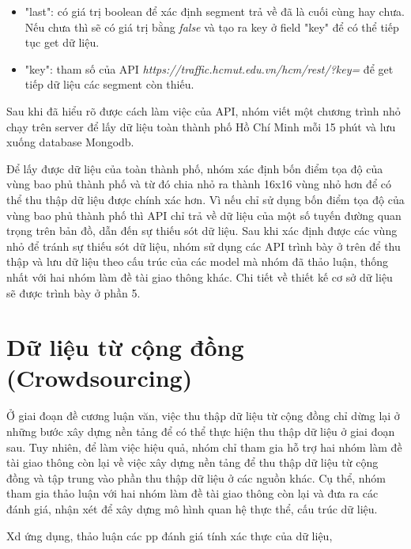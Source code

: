 \begin{itemize}
\begin{itemize}
    \item "last": có giá trị boolean để xác định segment trả về đã là cuối cùng hay chưa. Nếu chưa thì sẽ có giá trị bằng \textit{false} và tạo ra key ở field "key" để có thể tiếp tục get dữ liệu.
    \item "key": tham số của API \textit{https://traffic.hcmut.edu.vn/hcm/rest/?key=} để get tiếp dữ liệu các segment còn thiếu.
    \end{itemize}
\end{itemize}
Sau khi đã hiểu rõ được cách làm việc của API, nhóm viết một chương trình nhỏ chạy trên server để lấy dữ liệu toàn thành phố Hồ Chí Minh mỗi 15 phút và lưu xuống database Mongodb.

Để lấy được dữ liệu của toàn thành phố, nhóm xác định bốn điểm tọa độ của vùng bao phủ thành phố và từ đó chia nhỏ ra thành 16x16 vùng nhỏ hơn để có thể thu thập dữ liệu được chính xác hơn. Vì nếu chỉ sử dụng bốn điểm tọa độ của vùng bao phủ thành phố thì API chỉ trả về dữ liệu của một số tuyến đường quan trọng trên bản đồ, dẫn đến sự thiếu sót dữ liệu. Sau khi xác định được các vùng nhỏ để tránh sự thiếu sót dữ liệu, nhóm sử dụng các API trình bày ở trên để thu thập và lưu dữ liệu theo cấu trúc của các model mà nhóm đã thảo luận, thống nhất với hai nhóm làm đề tài giao thông khác. Chi tiết về thiết kế cơ sở dữ liệu sẽ được trình bày ở phần 5.

\section{Dữ liệu từ cộng đồng (Crowdsourcing)}
Ở giai đoạn đề cương luận văn, việc thu thập dữ liệu từ cộng đồng chỉ dừng lại ở những bước xây dựng nền tảng để có thể thực hiện thu thập dữ liệu ở giai đoạn sau. Tuy nhiên, để làm việc hiệu quả, nhóm chỉ tham gia hỗ trợ hai nhóm làm đề tài giao thông còn lại về việc xây dựng nền tảng để thu thập dữ liệu từ cộng đồng và tập trung vào phần thu thập dữ liệu ở các nguồn khác. Cụ thể, nhóm tham gia thảo luận với hai nhóm làm đề tài giao thông còn lại và đưa ra các đánh giá, nhận xét để xây dựng mô hình quan hệ thực thể, cấu trúc dữ liệu. 


Xd ứng dụng, thảo luận các pp đánh giá tính xác thực của dữ liệu,

